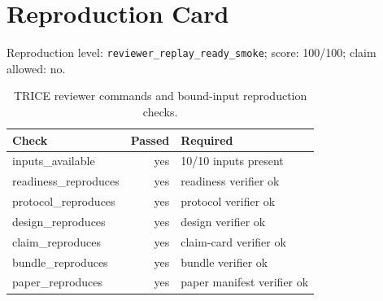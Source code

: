 \section{Reproduction Card}
Reproduction level: \texttt{reviewer\_replay\_ready\_smoke}; score: 100/100; claim allowed: no.

\begin{table}[h]
\centering
\begin{tabular}{lrl}
\toprule
Check & Passed & Required \\
\midrule
inputs\_available & yes & 10/10 inputs present \\
readiness\_reproduces & yes & readiness verifier ok \\
protocol\_reproduces & yes & protocol verifier ok \\
design\_reproduces & yes & design verifier ok \\
claim\_reproduces & yes & claim-card verifier ok \\
bundle\_reproduces & yes & bundle verifier ok \\
paper\_reproduces & yes & paper manifest verifier ok \\
\bottomrule
\end{tabular}
\caption{TRICE reviewer commands and bound-input reproduction checks.}
\end{table}
